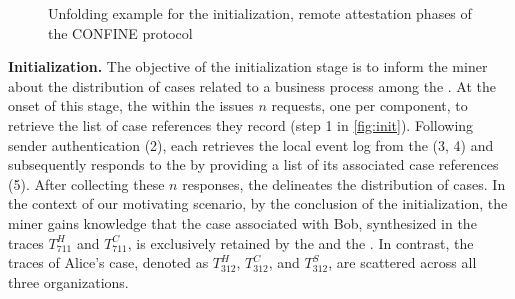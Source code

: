 \begin{figure}[t]
	\hfill
	\hfill
	\caption{Unfolding example for the initialization, remote attestation phases of the CONFINE protocol}
	\label{fig:workflow}
\end{figure}

\noindent\textbf{Initialization.} The objective of the initialization stage is to inform the miner about the distribution of cases related to a business process among the . At the onset of this stage, the  within the  issues $n$ requests, one per  component, %
to retrieve the list of case references they record (step 1 in \cref{fig:init}). Following sender authentication (2), each  retrieves the local event log from the  (3, 4) and subsequently responds to the  by providing a list of its associated case references (5). After collecting these $n$ responses, the  delineates the distribution of cases. In the context of our motivating scenario, by the conclusion of the initialization, the miner gains knowledge that the case associated with Bob, synthesized in the traces $T^H_{711}$ and $T^C_{711}$, is exclusively retained by the  and the . In contrast, the traces of Alice's case, denoted as $T^H_{312}$, $T^C_{312}$, and $T^S_{312}$, are scattered across all three organizations.

